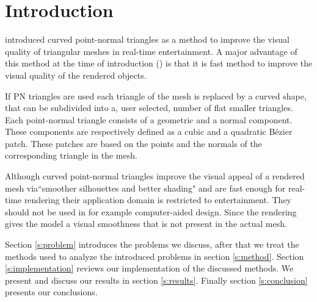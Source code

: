 
\section{Introduction}
\label{s:introduction}

\textcite{vlachos2001curved} introduced curved point-normal triangles as a method to improve the visual quality of triangular meshes in real-time entertainment. A major advantage of this method at the time of introduction (\citeyear{vlachos2001curved}) is that it is fast method to improve the visual quality of the rendered objects.

If PN triangles are used each triangle of the mesh is replaced by a curved shape, that can be subdivided into a, user selected, number of flat smaller triangles. Each point-normal triangle consists of a geometric and a normal component. These components are respectively defined as a cubic and a quadratic Bézier patch. These patches are based on the points and the normals of the corresponding triangle in the mesh. 


Although curved point-normal triangles improve the visual appeal of a rendered mesh via``smoother silhouettes and better shading" \cite{vlachos2001curved} and are fast enough for real-time rendering their application domain is restricted to entertainment. They should not be used in for example computer-aided design. Since the rendering gives the model a visual smoothness that is not present in the actual mesh. 


Section \ref{s:problem} introduces the problems we discuss, after that we treat the methods used to analyze the introduced problems in section \ref{s:method}. Section \ref{s:implementation} reviews our implementation of the discussed methods. We present and discuss our results in section \ref{s:results}. Finally section \ref{s:conclusion} presents our conclusions. 


